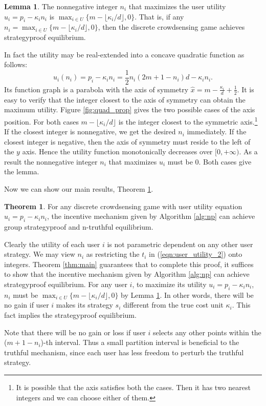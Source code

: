 \documentclass[conference]{IEEEtran}
\theoremstyle{definition}
\newtheorem{theorem}{Theorem}
\newtheorem{lemma}{Lemma}
\begin{document}
{\begin{lemma}
\label{lem:quadratic}
The nonnegative integer $n_i$ that maximizes the user utility $u_i = p_i - \kappa_in_i$ is $\max_{i\in U} \{m-\lfloor \kappa_i/d \rfloor, 0\}$.
{\color{blue} That is, if any $n_i = \max_{i\in U} \{m-\lfloor \kappa_i/d \rfloor, 0\}$, then the discrete crowdsensing game achieves strategyproof equilibrium. }
\end{lemma}
\begin{IEEEproof}
In fact the utility may be real-extended into a concave quadratic function as follows:
\[ u_i(n_i) = p_i - \kappa_in_i = \frac{1}{2}n_i(2m+1-n_i)d - \kappa_in_i. \]
Its function graph is a parabola with the axis of symmetry $\hat{x}=m-\frac{\kappa_i}{d}+\frac{1}{2}$. It is easy to verify that the integer closest to the axis of symmetry can obtain the maximum utility. Figure \ref{fig:quad_prop} gives the two possible cases of the axis position. For both cases $m-\lfloor \kappa_i/d \rfloor$ is the integer closest to the symmetric axis.\footnote{It is possible that the axis satisfies both the cases. Then it has two nearest integers and we can choose either of them.} If the closest integer is nonnegative, we get the desired $n_i$ immediately. If the closest integer is negative, then the axis of symmetry must reside to the left of the $y$ axis. Hence the utility function monotonically decreases over $[0,+\infty)$. As a result the nonnegative integer $n_i$ that maximizes $u_i$ must be 0. Both cases give the lemma.
\end{IEEEproof}

Now we can show our main results, Theorem \ref{thm:discrete}.
\begin{theorem}
\label{thm:discrete}
For any discrete crowdsensing game with user utility equation $u_i = p_i - \kappa_in_i$, the incentive mechanism given by Algorithm \ref{alg:np} can achieve group strategyproof and n-truthful equilibrium.
\end{theorem}
\begin{IEEEproof}
Clearly the utility of each user $i$ is not parametric dependent on any other user strategy. We may view $n_i$ as restricting the $t_i$ in (\ref{eqn:user_utility_2}) onto integers. %
Theorem \ref{thm:main} guarantees that to complete this proof, it suffices to show that the incentive mechanism given by Algorithm \ref{alg:np} can achieve strategyproof equilibrium. For any user $i$, to maximize its utility $u_i = p_i - \kappa_in_i$, $n_i$ must be $\max_{i\in U}\{m-\lfloor \kappa_i/d \rfloor, 0\}$ by Lemma \ref{lem:quadratic}. In other words, there will be no gain if user $i$ makes its strategy $s_i$ different from the true cost unit $\kappa_i$. This fact implies the strategyproof equilibrium.
\end{IEEEproof}
}
{\color{black}Note that there will be no gain or loss if user $i$ selects any other points within the ($m+1-n_i$)-th interval. Thus a small partition interval is beneficial to the truthful mechanism, since each user has less freedom to perturb the truthful strategy.}
\end{document}

